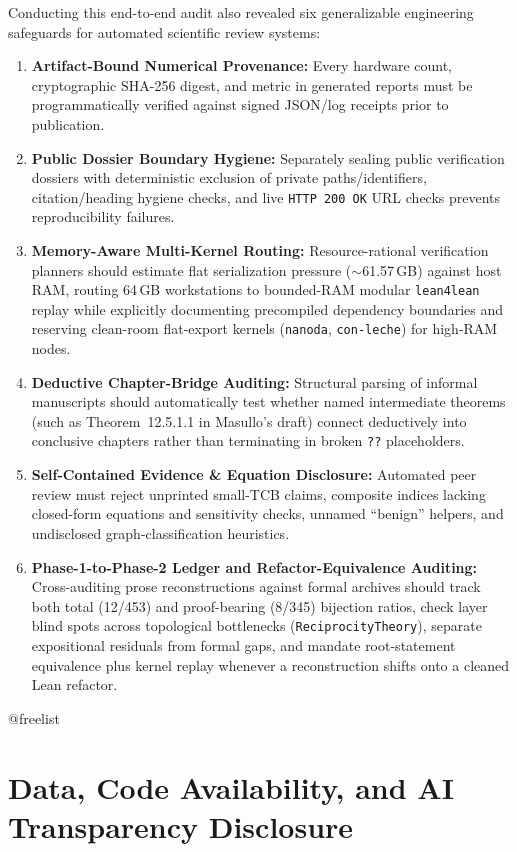 \documentclass[11pt,a4paper]{article}
\makeatletter
\providecommand{\FloatBarrier}{%
  \par
  \expandafter\ifx\csname @freelist\endcsname\relax\else
    \ifx\@deferlist\@empty\else
      \clearpage
    \fi
  \fi
}
\let\orig@section\section
\renewcommand{\section}{\FloatBarrier\orig@section}
\makeatother
\begin{document}
Conducting this end-to-end audit also revealed six generalizable engineering safeguards for automated scientific review systems:
\begin{enumerate}
  \item \textbf{Artifact-Bound Numerical Provenance:} Every hardware count, cryptographic SHA-256 digest, and metric in generated reports must be programmatically verified against signed JSON/log receipts prior to publication.
  \item \textbf{Public Dossier Boundary Hygiene:} Separately sealing public verification dossiers with deterministic exclusion of private paths/identifiers, citation/heading hygiene checks, and live \texttt{HTTP 200 OK} URL checks prevents reproducibility failures.
  \item \textbf{Memory-Aware Multi-Kernel Routing:} Resource-rational verification planners should estimate flat serialization pressure ($\sim$61.57\,GB) against host RAM, routing 64\,GB workstations to bounded-RAM modular \texttt{lean4lean} replay while explicitly documenting precompiled dependency boundaries and reserving clean-room flat-export kernels (\texttt{nanoda}, \texttt{con-leche}) for high-RAM nodes.
  \item \textbf{Deductive Chapter-Bridge Auditing:} Structural parsing of informal manuscripts should automatically test whether named intermediate theorems (such as Theorem~12.5.1.1 in Masullo's draft) connect deductively into conclusive chapters rather than terminating in broken \texttt{??} placeholders.
  \item \textbf{Self-Contained Evidence \& Equation Disclosure:} Automated peer review must reject unprinted small-TCB claims, composite indices lacking closed-form equations and sensitivity checks, unnamed ``benign'' helpers, and undisclosed graph-classification heuristics.
  \item \textbf{Phase-1-to-Phase-2 Ledger and Refactor-Equivalence Auditing:} Cross-auditing prose reconstructions against formal archives should track both total (12/453) and proof-bearing (8/345) bijection ratios, check layer blind spots across topological bottlenecks (\texttt{ReciprocityTheory}), separate expositional residuals from formal gaps, and mandate root-statement equivalence plus kernel replay whenever a reconstruction shifts onto a cleaned Lean refactor.
\end{enumerate}

\section{Data, Code Availability, and AI Transparency Disclosure}
\end{document}

